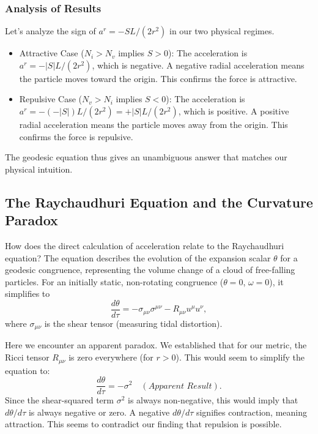 \documentclass[%
  reprint,
  superscriptaddress,
  showpacs,
  showkeys,
  amsmath,amssymb,
  pra,
  longbibliography,
  floatfix,
]{revtex4-2}
\begin{document}
\subsubsection{Analysis of Results}
Let's analyze the sign of $a^r = -SL/(2r^2)$ in our two physical regimes.
\begin{itemize}
    \item {Attractive Case ($N_i > N_v$ implies $S > 0$):}
    The acceleration is $a^r = -|S|L/(2r^2)$, which is {negative}. A negative radial acceleration means the particle moves toward the origin. This confirms the force is attractive.

    \item {Repulsive Case ($N_v > N_i$ implies $S < 0$):}
    The acceleration is $a^r = -(-|S|)L/(2r^2) = +|S|L/(2r^2)$, which is {positive}. A positive radial acceleration means the particle moves away from the origin. This confirms the force is repulsive.
\end{itemize}
The geodesic equation thus gives an unambiguous answer that matches our physical intuition.

\subsection{The Raychaudhuri Equation and the Curvature Paradox}

How does the direct calculation of acceleration relate to the Raychaudhuri equation? The equation describes the evolution of the expansion scalar $\theta$ for a geodesic congruence, representing the volume change of a cloud of free-falling particles. For an initially static, non-rotating congruence ($\theta=0$, $\omega=0$), it simplifies to
\begin{equation}
\frac{d\theta}{d\tau} = - \sigma_{\mu\nu}\sigma^{\mu\nu} - R_{\mu\nu}u^\mu u^\nu,
\label{eq:raychaudhuri}
\end{equation}
where $\sigma_{\mu\nu}$ is the shear tensor (measuring tidal distortion).

Here we encounter an apparent paradox. We established that for our metric, the Ricci tensor $R_{\mu\nu}$ is zero everywhere (for $r>0$). This would seem to simplify the equation to:
\begin{equation}
\frac{d\theta}{d\tau} = - \sigma^2 \quad (\textit{Apparent Result}).
\end{equation}
Since the shear-squared term $\sigma^2$ is always non-negative, this would imply that $d\theta/d\tau$ is always negative or zero. A negative $d\theta/d\tau$ signifies contraction, meaning attraction. This seems to contradict our finding that repulsion is possible.
\end{document}

